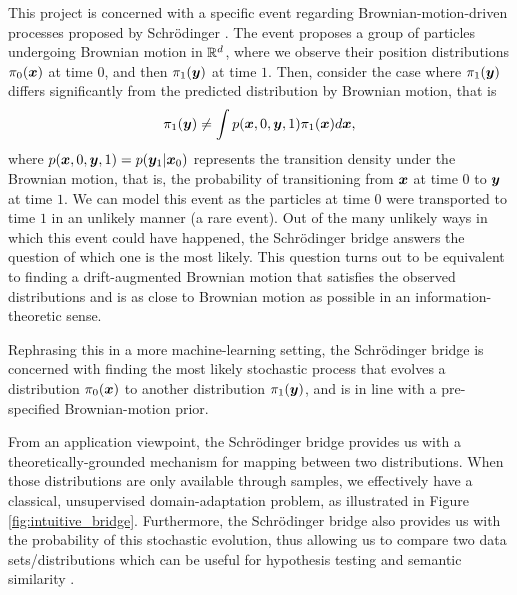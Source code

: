 \documentclass[a4paper,12pt,twoside,openright]{report}
\theoremstyle{definition}
\begin{document}
 This project is concerned with a specific event regarding Brownian-motion-driven processes proposed by Schrödinger \citep{schrodinger1931uber, schrodinger1932theorie}. The event proposes a group of particles undergoing Brownian motion in ${\mathbb{R}}^d$, where we observe their position distributions $\pi_0({\bm{x}})$ at time $0$, and then $\pi_1({\bm{y}})$ at time $1$. Then, consider the case where $\pi_1({\bm{y}})$ differs significantly from the predicted distribution by Brownian motion, that is
 \begin{align*}
     \pi_1({\bm{y}}) \neq \int p({\bm{x}}, 0, {\bm{y}} , 1) \pi_1({\bm{x}}) d{\bm{x}},
 \end{align*}
 where $p({\bm{x}}, 0, {\bm{y}} , 1) = p({\bm{y}}_1| {\bm{x}}_0)$ represents the transition density under the Brownian motion, that is, the probability of transitioning from ${\bm{x}}$ at time $0$ to ${\bm{y}}$ at time $1$. We can model this event as the particles at time $0$ were transported to time $1$ in an unlikely manner (a rare event). Out of the many unlikely ways in which this event could have happened, the Schrödinger bridge answers the question of which one is the most likely. This question turns out to be equivalent to finding a drift-augmented Brownian motion that satisfies the observed distributions and is as close to Brownian motion as possible in an information-theoretic sense.
 
 Rephrasing this in a more machine-learning setting, the Schrödinger bridge is concerned with finding the most likely stochastic process that evolves a distribution $\pi_0({\bm{x}})$ to another distribution $\pi_1({\bm{y}})$, and is in line with a pre-specified Brownian-motion prior.
 
 From an application viewpoint, the Schrödinger bridge provides us with a theoretically-grounded mechanism for mapping between two distributions. When those distributions are only available through samples, we effectively have a classical, unsupervised domain-adaptation problem, as illustrated in Figure \ref{fig:intuitive_bridge}. Furthermore, the Schrödinger bridge also provides us with the probability of this stochastic evolution, thus allowing us to compare two data sets/distributions which can be useful for hypothesis testing \citep{gretton2012kernel,ramdas2017wasserstein} and semantic similarity \citep{vargas2019model}.
 
\end{document}

